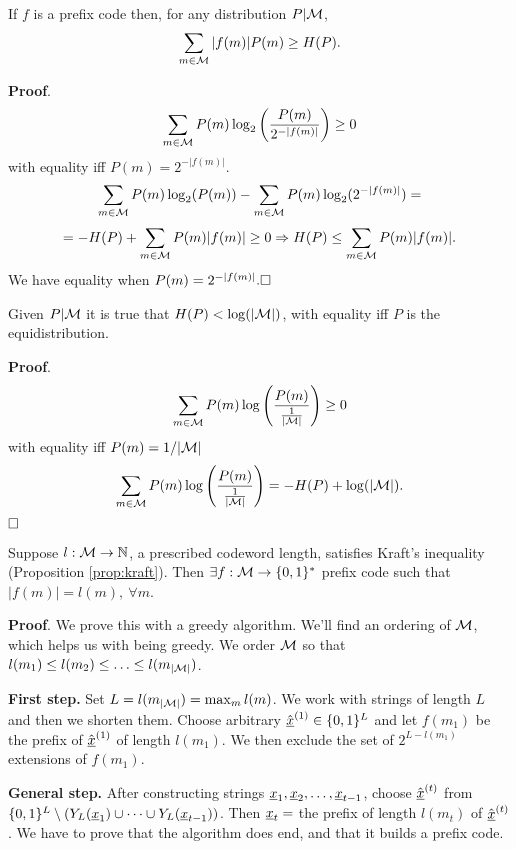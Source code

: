 \begin{prop}
	If $f$ is a prefix code then, for any distribution $P|\mathcal{M}$, $$\sum_{m\in\mathcal{M}}|f(m)|P(m) \geq H(P).$$
\end{prop}

\noindent\textbf{Proof}.
\[
\sum_{m \in\mathcal{M}}P(m) \log_2\left(\dfrac{P(m)}{2^{-|f(m)|}}\right) \geq 0
\]
with equality iff $P(m) = 2^{-|f(m)|}$.
\[
\sum_{m\in\mathcal{M}}P(m)\log_2(P(m)) - \sum_{m\in\mathcal{M}}P(m)\log_2(2^{-|f(m)|}) =
\]
\[
= -H(P) + \sum_{m\in\mathcal{M}}P(m)|f(m)| \geq 0 \Rightarrow H(P) \leq \sum_{m\in\mathcal{M}}P(m)|f(m)|.
\]
We have equality when $P(m) = 2^{-|f(m)|}.\hfill\Box$

\begin{obs}
	Given $P|\mathcal{M}$ it is true that $H(P) < \log(|\mathcal{M}|)$, with equality iff $P$ is the equidistribution.
\end{obs}

\noindent\textbf{Proof}.
\[
\sum_{m\in\mathcal{M}}P(m)\log\left(\dfrac{P(m)}{\frac{1}{|\mathcal{M}|}} \right) \geq 0
\]
with equality iff $P(m) = {1}/{|\mathcal{M}|}$
\[
\sum_{m\in\mathcal{M}}P(m)\log\left(\dfrac{P(m)}{\frac{1}{|\mathcal{M}|}} \right) = -H(P)+\log(|\mathcal{M}|).
\]
$\hfill\Box$

\begin{thm}[Kraft]
	Suppose $l:\mathcal{M} \rightarrow \mathbb{N}$, a prescribed codeword length, satisfies Kraft's inequality (Proposition \ref{prop:kraft}). Then 
	$\exists f:\mathcal{M} \rightarrow \{0, 1\}^*$ prefix code such that $|f(m)| = l(m),\ \forall m$.
\end{thm}

\noindent\textbf{Proof}. We prove this with a greedy algorithm. We'll find an ordering of $\mathcal{M}$, which helps us with being greedy. We order $\mathcal{M}$ so that $l(m_1) \leq l(m_2) \leq \ldots \leq l(m_{|\mathcal{M}|})$.

\noindent\textbf{First step.} Set $L = l(m_{|\mathcal{M}|}) = \max_ml(m)$. We work with strings of length $L$ and then we shorten them. Choose arbitrary $\hat{\underline{x}}^{(1)} \in \{0, 1\}^L$ and let $f(m_1)$ be the prefix of $\hat{\underline{x}}^{(1)}$ of length $l(m_1)$. We then exclude the set of $2^{L - l(m_1)}$ extensions of $f(m_1)$.

\noindent\textbf{General step.} After constructing strings $\underline{x}_1,\underline{x}_2, \ldots, \underline{x}_{t-1}$, choose $\hat{\underline{x}}^{(t)}$ from $\{0, 1\}^L \setminus (Y_L(\underline{x}_1) \cup \cdots \cup Y_L(\underline{x}_{t-1}))$. Then $\underline{x}_t = $ the prefix of length $l(m_t)$ of $\hat{\underline{x}}^{(t)}$. We have to prove that the algorithm does end, and that it builds a prefix code.

